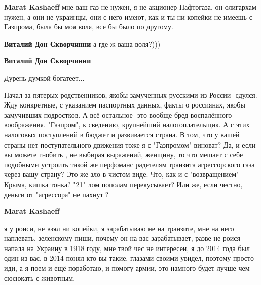 \begin{itemize}
\begin{itemize}
 
\textbf{Marat Kashaeff} мне ваш газ не нужен, я не акционер Нафтогаза, он олигархам нужен, а они не украинцы, они с него имеют, как и ты ни копейки не имеешь с Газпрома, была бы моя воля, все бы было по другому.

 
\textbf{Виталий Дон Скворчинни} а где ж ваша воля?)))

 
\textbf{Виталий Дон Скворчинни} 

Дурень думкой богатеет...

Начал за пятерых родственников, якобы замученных русскими из России- сдулся.
Жду конкретные, с указанием паспортных данных, факты о россиянах, якобы
замучивших подростков. А всё остальное- это вообще бред воспалённого
воображения. "Газпром", к сведению, крупнейший налогоплательщик. А с этих
налоговых поступлений в бюджет и развивается страна.  В том, что у вашей страны
нет поступательного движения тоже я с "Газпромом" виноват? Да, и если вы можете
гнобить , не выбирая выражений, женщину, то что мешает с себе подобными
устроить такой же перфоманс радетелям транзита агрессорского газа через вашу
страну? Это же зло в чистом виде. Что, как и с "возвращением" Крыма, кишка
тонка? "21" лом пополам перекусывает? Или же, если честно, деньги от
"агрессора" не пахнут🤣?

 
\textbf{Marat Kashaeff} 🤡 

я у роиси, не взял ни копейки, я зарабатываю не на транзите, мне на него
наплевать, зеленскому пиши, почему он на вас зарабатывает, разве не роися
напала на Украину в 1918 году, мне твой чес не интересен, я до 2014 года был
один из вас, в 2014 понял кто вы такие, глазами своими увидел, поэтому просто
иди, а я поем и ещё поработаю, и помогу армии, это намного будет лучше чем
сюсюкать с животным.


\end{itemize}
\end{itemize}
